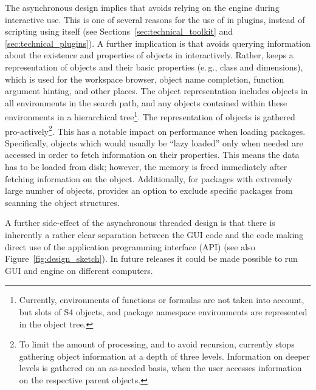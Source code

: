\documentclass[article,shortnames]{jss}
\begin{document}
The asynchronous design implies that  avoids relying on the
 engine during interactive use. This is one of several reasons for
the use of  in plugins, instead of scripting using
 itself (see Sections~\ref{sec:technical_toolkit} and \ref{sec:technical_plugins}).
A further implication is that  avoids querying information about the
existence and properties of objects in  interactively. Rather,
 keeps a representation of  objects and their basic properties
(e.\,g., class and dimensions), which is used for the workspace browser,
object name completion, function argument hinting, and
other places. The object representation includes objects in all environments
in the search path, and any objects contained within these environments in a
hierarchical tree\footnote{
    Currently, environments of functions or formulas are not taken into account, but slots of S4 objects,
    and package namespace environments are represented in the object tree.
}. The representation of  objects is gathered
pro-actively\footnote{
    To limit the amount of processing, and to avoid recursion,  currently stops
    gathering object information at a depth of three levels. Information on deeper levels is gathered
    on an as-needed basis, when the user accesses information on the respective parent objects.
}. This has a notable impact on performance when loading packages.
Specifically, objects which would usually be ``lazy loaded'' only when needed \citep[see][]{Ripley2004} are
accessed in order to fetch information on their properties. This means the data
has to be loaded from disk; however, the memory is freed immediately after fetching
information on the object. Additionally, for packages with extremely large number of objects, 
provides an option to exclude specific packages from scanning the object structures.

A further side-effect of the asynchronous threaded design is that there is
inherently a rather clear separation between the GUI code and the code making direct use
of the  application programming interface (API) (see also Figure~\ref{fig:design_sketch}). 
In future releases it could be made possible to run GUI and  engine on different computers.
\end{document}
